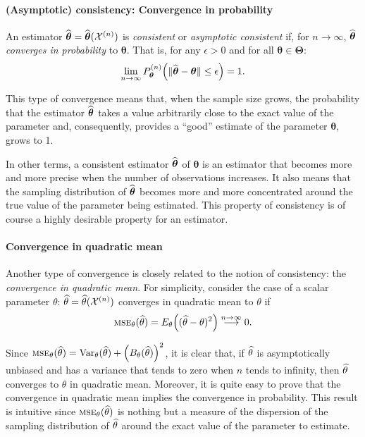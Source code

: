 \paragraph{(Asymptotic) consistency: Convergence in probability}

An estimator $\widehat{\boldsymbol\theta} =
\widehat{\boldsymbol\theta}(\mathcal{X}^{(n)})$ is \emph{consistent} or \emph{asymptotic consistent} if, for $n
\rightarrow \infty$, $\widehat{\boldsymbol\theta}$ \emph{converges in
probability} to $\boldsymbol\theta$. That is, for any $\epsilon > 0$ and for
all $\boldsymbol\theta \in \boldsymbol\Theta$:
\begin{equation}
    \lim_{n \rightarrow \infty} P_{\boldsymbol\theta}^{(n)} \left(
        \Vert\sthat{\boldsymbol\theta} - \boldsymbol\theta \Vert \leq \epsilon
        \right) = 1. \label{eq:consistency}
\end{equation}

This type of convergence means that, when the sample size grows, the
probability that the estimator $\widehat{\boldsymbol\theta}$ takes a value arbitrarily close to
the exact value of the parameter and, consequently, provides a “good” estimate
of the parameter $\boldsymbol\theta$, grows to 1. 

In other terms, a consistent estimator $\widehat{\boldsymbol\theta}$ of $\boldsymbol\theta$ is an estimator that becomes more and more precise when the number of observations increases. It also means that the sampling distribution of $\widehat{\boldsymbol\theta}$ becomes more and more concentrated around the true value of the parameter being estimated. This property of consistency is of course a highly desirable property for an estimator.

\paragraph{Convergence in quadratic mean}

Another type of convergence is closely related to the notion of consistency: the \emph{convergence in quadratic mean}. For simplicity, consider the case of a scalar parameter $\theta$: $\widehat{\theta}=\widehat{\theta}({\cal X}^{(n)})$ converges in quadratic mean to $\theta$ if
\[
	\stsc{MSE}_{\theta}(\sthat{\theta})=E_{\theta}\left((\sthat{\theta}-\theta)^2\right)  \stackrel{n \rightarrow \infty}{\longrightarrow} 0.
\]

Since $\stsc{MSE}_{\theta}(\sthat{\theta})={\rm Var}_{\theta}(\sthat{\theta}) + \left(B_{\theta}(\sthat{\theta})\right)^2$, it is clear that, if $\widehat{\theta}$ is asymptotically unbiased and has a variance that tends to zero when $n$ tends to infinity, then $\widehat{\theta}$ converges to $\theta$ in quadratic mean. Moreover, it is quite easy to prove that the convergence in quadratic mean implies the convergence in probability. This result is intuitive since $\stsc{MSE}_{\theta}(\sthat{\theta})$ is nothing but a measure of the dispersion of the sampling distribution of $\widehat{\theta}$ around the exact value of the parameter to estimate.

